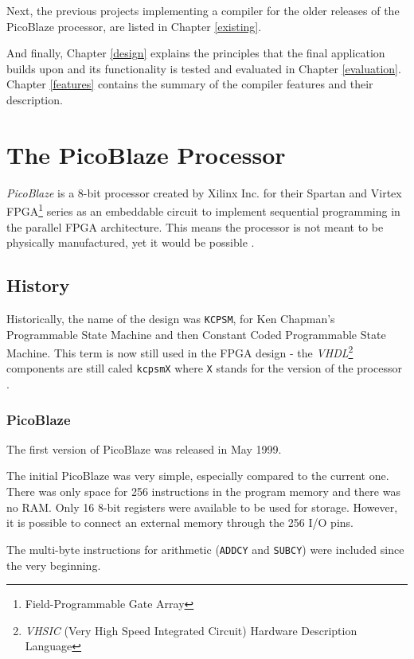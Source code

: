     Next, the previous projects implementing a compiler for the older releases of the PicoBlaze processor, are listed in Chapter \ref{existing}.

    And finally, Chapter \ref{design} explains the principles that the final application builds upon and its functionality is tested and evaluated in Chapter \ref{evaluation}. Chapter \ref{features} contains the summary of the compiler features and their description.

\chapter{The PicoBlaze Processor}\label{processor}

\emph{PicoBlaze} is a 8-bit processor created by Xilinx Inc. for their Spartan and Virtex FPGA\footnote{Field-Programmable Gate Array} series as an embeddable circuit to implement sequential programming in the parallel FPGA architecture. This means the processor is not meant to be physically manufactured, yet it would be possible \cite{PicoBlazeWeb}.

    \section{History}

    Historically, the name of the design was \texttt{KCPSM}, for Ken Chapman's Programmable State Machine and then Constant Coded Programmable State Machine. This term is now still used in the FPGA design - the \emph{VHDL}\footnote{\emph{VHSIC} (Very High Speed Integrated Circuit) Hardware Description Language} components are still caled \texttt{kcpsmX} where \texttt{X} stands for the version of the processor \cite{DSPwFPGA}.

        \subsection{PicoBlaze}

        The first version of PicoBlaze was released in May 1999.

        The initial PicoBlaze was very simple, especially compared to the current one. There was only space for 256 instructions in the program memory and there was no RAM. Only 16 8-bit registers were available to be used for storage. However, it is possible to connect an external memory through the 256 I/O pins.

        The multi-byte instructions for arithmetic (\texttt{ADDCY} and \texttt{SUBCY}) were included since the very beginning.

